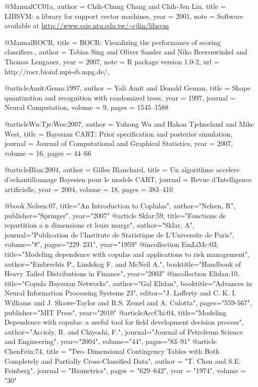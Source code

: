 @Manual{CC01a,
  author =	 {Chih-Chung Chang and Chih-Jen Lin},
  title =	 {{LIBSVM}: a library for support vector machines},
  year =	 {2001},
  note =	 {Software available at \url{http://www.csie.ntu.edu.tw/~cjlin/libsvm}}
}

@Manual{ROCR,
    title = {ROCR: Visualizing the performance of scoring classifiers.},
    author = {Tobias Sing and Oliver Sander and Niko Beerenwinkel and
Thomas Lengauer},
    year = {2007},
    note = {R package version 1.0-2},
    url = {http://rocr.bioinf.mpi-sb.mpg.de/},
  }

@article{Amit:Gema:1997,
    author = {Yali Amit and Donald Geman},
    title = {Shape quantization and recognition with randomized trees},
    year = {1997},
    journal = {Neural Computation},
    volume = {9},
    pages = {1545--1588}
}

@article{Wu:Tje:Wes:2007,
    author = {Yuhong Wu and Hakon Tjelmeland and Mike West},
    title = {{B}ayesian {CART}: Prior specification and posterior
simulation},
    journal = {Journal of Computational and Graphical Statistics},
    year = {2007},
    volume = {16},
    pages = {44--66}
}

@article{Blan:2004,
    author = {Gilles Blanchard},
    title = {Un algorithme accelere d'echantillonnage {B}ayesien pour le modele {CART}},
    journal = {Revue d'Intelligence artificielle},
    year = {2004},
    volume = {18},
    pages = {383--410}
}


@book{ Nelsen:07,
	title="An Introduction to Coplulas",
	author="Nelsen, R",
	publisher="Springer",
	year="2007"
}
@article{ Sklar:59,
	title="Fonctions de repartition a n dimensions et leurs marge",
	author="Sklar, A",
	journal="Publication de l’Institute de Statistique de L’Universite de Paris",
	volume="8",
	pages="229--231",
	year="1959"
}
@incollection{ EmLiMc:03,
	title="Modeling dependence with copulas and applications to risk management",
	author="Embrechts P., Lindskog F. and McNeil A.",
	booktitle="Handbook of Heavy Tailed Distributions in Finance",
	year="2003"
}
@incollection{ Elidan:10,
	title="Copula Bayesian Networks",
	author="Gal Elidan",
	booktitle="Advances in Neural Information Processing Systems 23",
	editor="J. Lafferty and C. K. I. Williams and J. Shawe-Taylor and R.S. Zemel and A. Culotta",
	pages="559-567",
	publisher="MIT Press",
	year="2010"
}
@article{AccChi:04,
	title="Modeling Dependence with copulas: a useful tool for field development decision process",
	author="Accioly, R. and Chiyoshi, F.",
	journal="Journal of Petroleum Science and Engineering",
	year="2004",
	volume="44",
	pages="83--91"
}
@article{ ChenFein:74,
	title = "Two--Dimensional Contingency Tables with Both Completely and Partially Cross-Classified Data",
	author = "T. Chen and S.E. Feinberg",
	journal = "Biometrics",
	pages = "629--642",
	year = "1974",
	volume = "30"
}

